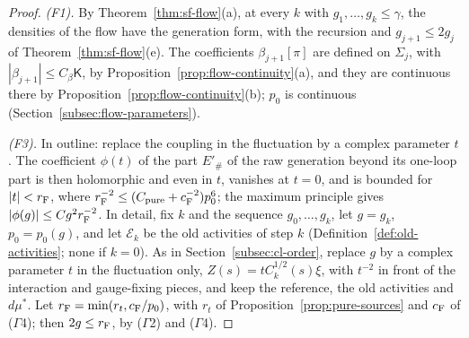 \begin{proof}
\emph{(F1).} By Theorem~\ref{thm:sf-flow}(a), at every $k$ with $g_1,\dots,g_k\le\gamma$, the densities of the flow have the generation form, with the recursion and $g_{j+1}\le2g_j$ of Theorem~\ref{thm:sf-flow}(e). The coefficients $\beta_{j+1}[\pi]$ are defined on $\Sigma_j$, with $|\beta_{j+1}|\le C_\beta\mathsf K$, by Proposition~\ref{prop:flow-continuity}(a), and they are continuous there by Proposition~\ref{prop:flow-continuity}(b); $p_0$ is continuous (Section~\ref{subsec:flow-parameters}).

\emph{(F3).} In outline: replace the coupling in the fluctuation by a complex parameter $t$. The coefficient $\phi(t)$ of the part $E'_\#$ of the raw generation beyond its one-loop part is then holomorphic and even in $t$, vanishes at $t=0$, and is bounded for $|t|<r_{\rm F}$, where $r_{\rm F}^{-2}\le(C_{\rm pure}+c_{\rm F}^{-2})p_0^6$; the maximum principle gives $|\phi(g)|\le Cg^2r_{\rm F}^{-2}$. In detail, fix $k$ and the sequence $g_0,\dots,g_k$, let $g=g_k$, $p_0=p_0(g)$, and let $\mathcal E_k$ be the old activities of step $k$ (Definition~\ref{def:old-activities}; none if $k=0$). As in Section~\ref{subsec:cl-order}, replace $g$ by a complex parameter $t$ in the fluctuation only, $Z(s)=tC_k^{1/2}(s)\xi$, with $t^{-2}$ in front of the interaction and gauge-fixing pieces, and keep the reference, the old activities and $d\mu^*$. Let $r_{\rm F}=\min(r_t,c_{\rm F}/p_0)$, with $r_t$ of Proposition~\ref{prop:pure-sources} and $c_{\rm F}$ of ($\Gamma$4); then $2g\le r_{\rm F}$, by ($\Gamma$2) and ($\Gamma$4).


\end{proof}
